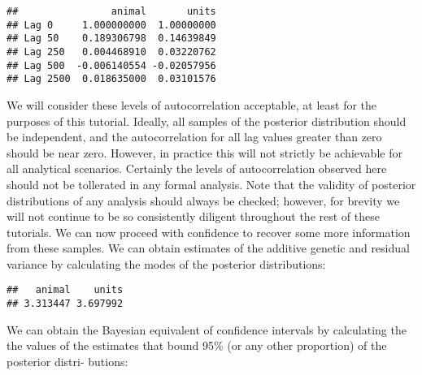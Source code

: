 \documentclass[
  12pt,
]{book}
\newenvironment{Shaded}{\begin{snugshade}}{\end{snugshade}}
\newcommand{\FloatTok}[1]{\textcolor[rgb]{0.00,0.00,0.81}{#1}}
\newcommand{\FunctionTok}[1]{\textcolor[rgb]{0.00,0.00,0.00}{#1}}
\newcommand{\NormalTok}[1]{#1}
\newcommand{\SpecialCharTok}[1]{\textcolor[rgb]{0.00,0.00,0.00}{#1}}
\begin{document}
\begin{Shaded}
\end{Shaded}

\begin{verbatim}
##                animal       units
## Lag 0     1.000000000  1.00000000
## Lag 50    0.189306798  0.14639849
## Lag 250   0.004468910  0.03220762
## Lag 500  -0.006140554 -0.02057956
## Lag 2500  0.018635000  0.03101576
\end{verbatim}

We will consider these levels of autocorrelation acceptable, at least for the purposes of this tutorial. Ideally, all samples of the posterior distribution should be independent, and the autocorrelation for all lag values greater than zero should be near zero. However, in practice this will not strictly be achievable for all analytical scenarios. Certainly the levels of autocorrelation observed here should not be tollerated in any formal analysis. Note that the validity of posterior distributions of any analysis should always be checked; however, for brevity we will not continue to be so consistently diligent throughout the rest of these tutorials. We can now proceed with confidence to recover some more information from these samples. We can obtain estimates of the additive genetic and residual variance by calculating the modes of the posterior distributions:

\begin{Shaded}
\end{Shaded}

\begin{verbatim}
##   animal    units 
## 3.313447 3.697992
\end{verbatim}

We can obtain the Bayesian equivalent of confidence intervals by calculating the the values of the estimates that bound 95\% (or any other proportion) of the posterior distri- butions:

\begin{Shaded}
\end{Shaded}
\end{document}
